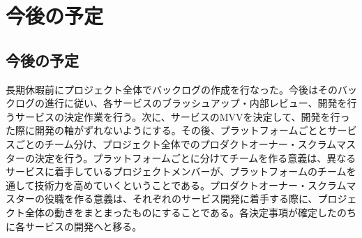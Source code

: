 \chapter{今後の予定}
\section{今後の予定}

長期休暇前にプロジェクト全体でバックログの作成を行なった。今後はそのバックログの進行に従い、各サービスのブラッシュアップ・内部レビュー、開発を行うサービスの決定作業を行う。次に、サービスのMVVを決定して、開発を行った際に開発の軸がずれないようにする。その後、プラットフォームごととサービスごとのチーム分け、プロジェクト全体でのプロダクトオーナー・スクラムマスターの決定を行う。プラットフォームごとに分けてチームを作る意義は、異なるサービスに着手しているプロジェクトメンバーが、プラットフォームのチームを通して技術力を高めていくということである。プロダクトオーナー・スクラムマスターの役職を作る意義は、それぞれのサービス開発に着手する際に、プロジェクト全体の動きをまとまったものにすることである。各決定事項が確定したのちに各サービスの開発へと移る。

